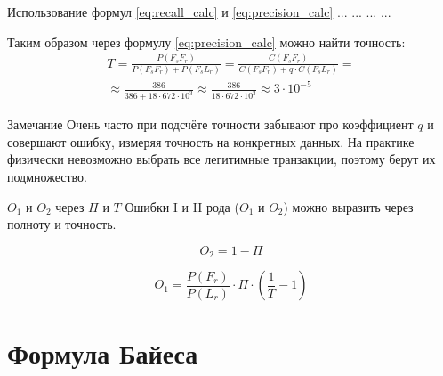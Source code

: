 \begin{frame}{Использование формул \eqref{eq:recall_calc} и \eqref{eq:precision_calc}} 
	... ... ... ...
	
	Таким образом через формулу  \eqref{eq:precision_calc} можно найти точность:
	\begin{eqnarray*}
		T = \frac{P(F_s F_r)}{P(F_s F_r) + P(F_s L_r )} = 
		\frac{C(F_s F_r)}{C(F_s F_r) + q \cdot C(F_s L_r)}  = \\
		\approx \frac{386}{386 + 18 \cdot  672 \cdot 10^3 }
		\approx \frac{386}{18 \cdot  672 \cdot 10^3 }
		\approx 3 \cdot 10^{-5}
	\end{eqnarray*}
	
	\begin{block}{Замечание}
		Очень часто при подсчёте точности забывают про коэффициент $q$ 
		и совершают ошибку, измеряя точность на конкретных данных.
		На практике физически невозможно выбрать все легитимные транзакции,
		поэтому берут их подмножество.
	\end{block}
	
\end{frame}

\begin{frame}{$O_1$ и $O_2$ через $\Pi$ и $T$}
	Ошибки I и II рода ($O_1$ и $O_2$)
	можно выразить через полноту и точность.
	
	\begin{equation}\label{eq:O_2_from_recall}
	O_2 = 1 - \Pi
	\end{equation}
	
	\begin{equation}\label{eq:O_1_from_recall_and_presicion}
	O_1 = \frac{P(F_r)}{P(L_r)} \cdot \Pi \cdot \left( \frac{1}{T} - 1 \right)
	\end{equation}
	
	
	
\end{frame}




\section{Формула Байеса}\label{section:Bayes}

